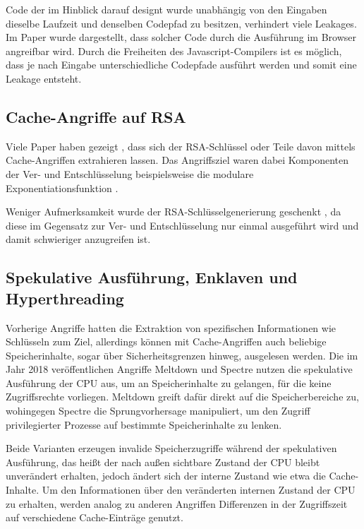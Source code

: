 Code der im Hinblick darauf designt wurde unabhängig von den Eingaben dieselbe Laufzeit und denselben Codepfad zu besitzen, verhindert viele Leakages.
Im Paper \cite{DriveByPaper} wurde dargestellt, dass solcher Code durch die Ausführung im Browser angreifbar wird.
Durch die Freiheiten des Javascript-Compilers ist es möglich, dass je nach Eingabe unterschiedliche Codepfade ausführt werden und somit eine Leakage entsteht.

\subsection{Cache-Angriffe auf RSA}

Viele Paper haben gezeigt \cite{CacheBleedOpenSSLRSA, FlushReload, DriveByPaper}, dass sich der RSA-Schlüssel oder Teile davon mittels Cache-Angriffen extrahieren lassen. Das Angriffsziel waren dabei Komponenten der Ver- und Entschlüsselung beispielsweise die modulare Exponentiationsfunktion \cite{CacheBleedOpenSSLRSA, DriveByPaper, DriveByPaper}.

Weniger Aufmerksamkeit wurde der RSA-Schlüsselgenerierung geschenkt \cite{RSAKeyGeneration2}, da diese im Gegensatz zur Ver- und Entschlüsselung nur einmal ausgeführt wird und damit schwieriger anzugreifen ist.


\subsection{Spekulative Ausführung, Enklaven und Hyperthreading}
\label{related_work}

Vorherige Angriffe hatten die Extraktion von spezifischen Informationen wie Schlüsseln zum Ziel, allerdings können mit Cache-Angriffen auch beliebige Speicherinhalte, sogar über Sicherheitsgrenzen hinweg, ausgelesen werden.
Die im Jahr 2018 veröffentlichen Angriffe Meltdown \cite{MeltdownPaper} und Spectre \cite{SpectrePaper} nutzen die spekulative Ausführung der CPU aus, um an Speicherinhalte zu gelangen, für die keine Zugriffsrechte vorliegen.
Meltdown greift dafür direkt auf die Speicherbereiche zu, wohingegen Spectre die Sprungvorhersage manipuliert, um den Zugriff privilegierter Prozesse auf bestimmte Speicherinhalte zu lenken.

Beide Varianten erzeugen invalide Speicherzugriffe während der spekulativen Ausführung, das heißt der nach außen sichtbare Zustand der CPU bleibt unverändert erhalten, jedoch ändert sich der interne Zustand wie etwa die Cache-Inhalte.
Um den Informationen über den veränderten internen Zustand der CPU zu erhalten, werden analog zu anderen Angriffen Differenzen in der Zugriffszeit auf verschiedene Cache-Einträge genutzt.

